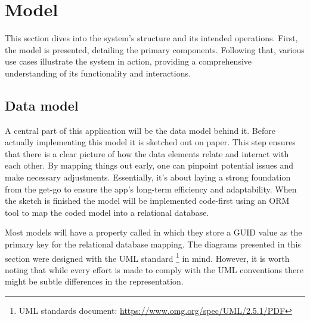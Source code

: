 \newpage

\section{Model}

This section dives into the system's structure and its intended operations. 
First, the model is presented, detailing the primary components. 
Following that, various use cases illustrate the system in action, providing a comprehensive understanding of its functionality and interactions.

\subsection{Data model}

A central part of this application will be the data model behind it. 
Before actually implementing this model it is sketched out on paper. 
This step ensures that there is a clear picture of how the data elements relate and interact with each other. 
By mapping things out early, one can pinpoint potential issues and make necessary adjustments. 
Essentially, it's about laying a strong foundation from the get-go to ensure the app's long-term efficiency and adaptability. 
When the sketch is finished the model will be implemented code-first using an ORM tool to map the coded model into a relational database. 

Most models will have a property called  in which they store a GUID value as the primary key for the relational database mapping. 
The diagrams presented in this section were designed with the UML standard \footnote{UML standards document: \url{https://www.omg.org/spec/UML/2.5.1/PDF}} in mind. 
However, it is worth noting that while every effort is made to comply with the UML conventions there might be subtle differences in the representation. 

